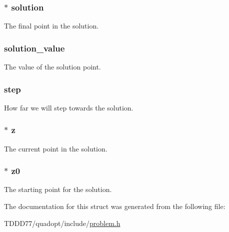 \subsubsection[{solution}]{$\ast$ solution}\label{structproblem_a70626c7db657c601438f867391005721}
The final point in the solution. \hypertarget{structproblem_a6fcb6ec86b1ba65bd2a34e9a9731c452}{}
\subsubsection[{solution\+\_\+value}]{ solution\+\_\+value}\label{structproblem_a6fcb6ec86b1ba65bd2a34e9a9731c452}
The value of the solution point. \hypertarget{structproblem_a9c398bc1d126ef3a4cf1efdc9d9f7423}{}
\subsubsection[{step}]{ step}\label{structproblem_a9c398bc1d126ef3a4cf1efdc9d9f7423}
How far we will step towards the solution. \hypertarget{structproblem_a840058b5c67561185c94da497d0d3da6}{}
\subsubsection[{z}]{$\ast$ z}\label{structproblem_a840058b5c67561185c94da497d0d3da6}
The current point in the solution. \hypertarget{structproblem_a2f7d9aba872a4653770df8dd6e3826a1}{}
\subsubsection[{z0}]{$\ast$ z0}\label{structproblem_a2f7d9aba872a4653770df8dd6e3826a1}
The starting point for the solution. 

The documentation for this struct was generated from the following file\+:\begin{DoxyCompactItemize}
\item 
T\+D\+D\+D77/quadopt/include/\hyperlink{problem_8h}{problem.\+h}\end{DoxyCompactItemize}
